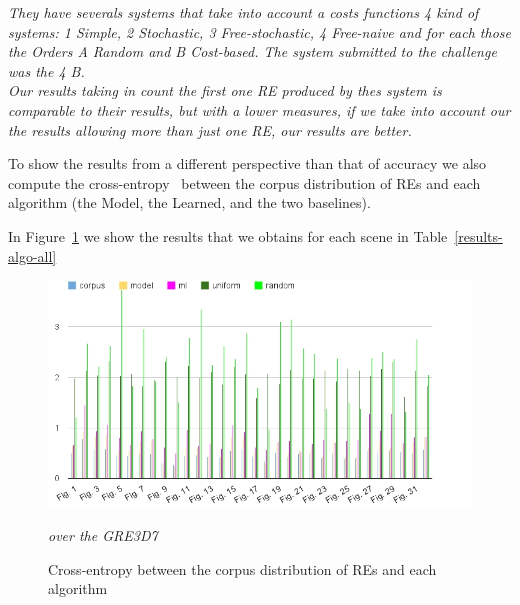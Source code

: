 \textit{They have severals systems that take into account a costs functions 4 kind of systems: 1 Simple, 2 Stochastic, 3 Free-stochastic, 4 Free-naive and for each those the Orders A Random and B Cost-based. The system submitted to the challenge was the 4 B.}\\

\textit{Our results taking in count the first one RE produced by thes system is comparable to their results, but with a lower measures, if we take into account our the results allowing more than just one RE, our results are better.}

To show the results from a different perspective than that of accuracy we also compute the cross-entropy~\cite{juraksky:spee08} between the corpus distribution of REs and each algorithm (the Model, the Learned, and the two baselines).    


In Figure~\ref{Entropy} we show the results that we obtains for each scene in Table~\ref{results-algo-all} 

\begin{figure}[h!]
\begin{center}
\includegraphics[width=.9\textwidth]{images/entropyComplete.jpg}
\end{center}
\vspace*{-2em}
\caption{Cross-entropy between the corpus distribution of REs and each algorithm} \textit{over the GRE3D7}\label{Entropy}
\end{figure}

